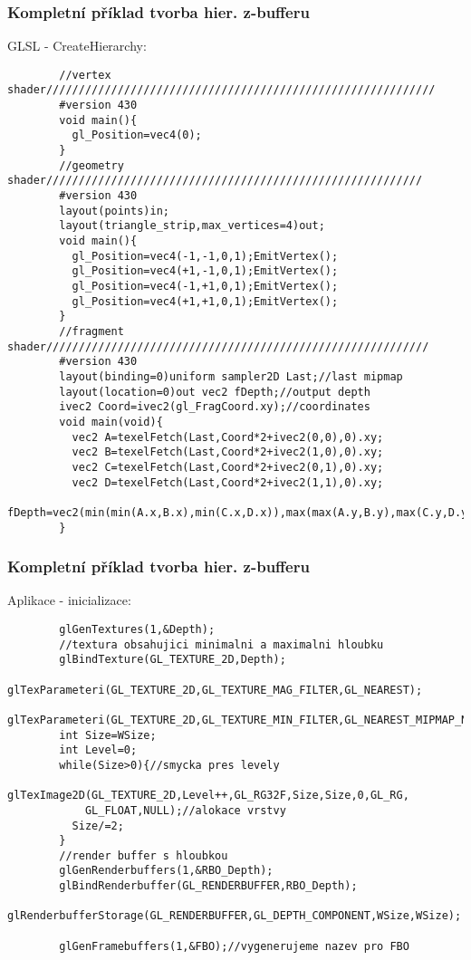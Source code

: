 \begin{frame}[fragile]
\frametitle{Kompletní příklad tvorba hier. z-bufferu}
		GLSL - CreateHierarchy:
		{\tiny
		\begin{verbatim}
		//vertex shader////////////////////////////////////////////////////////////
		#version 430
		void main(){
		  gl_Position=vec4(0);
		}
		//geometry shader//////////////////////////////////////////////////////////
		#version 430
		layout(points)in;
		layout(triangle_strip,max_vertices=4)out;
		void main(){
		  gl_Position=vec4(-1,-1,0,1);EmitVertex();
		  gl_Position=vec4(+1,-1,0,1);EmitVertex();
		  gl_Position=vec4(-1,+1,0,1);EmitVertex();
		  gl_Position=vec4(+1,+1,0,1);EmitVertex();
		}
		//fragment shader///////////////////////////////////////////////////////////
		#version 430
		layout(binding=0)uniform sampler2D Last;//last mipmap
		layout(location=0)out vec2 fDepth;//output depth
		ivec2 Coord=ivec2(gl_FragCoord.xy);//coordinates
		void main(void){
		  vec2 A=texelFetch(Last,Coord*2+ivec2(0,0),0).xy;
		  vec2 B=texelFetch(Last,Coord*2+ivec2(1,0),0).xy;
		  vec2 C=texelFetch(Last,Coord*2+ivec2(0,1),0).xy;
		  vec2 D=texelFetch(Last,Coord*2+ivec2(1,1),0).xy;
		  fDepth=vec2(min(min(A.x,B.x),min(C.x,D.x)),max(max(A.y,B.y),max(C.y,D.y)));
		}
		\end{verbatim}
		}
\end{frame}

\begin{frame}[fragile]
\frametitle{Kompletní příklad tvorba hier. z-bufferu}
		Aplikace - inicializace:
		{\scriptsize
		\begin{verbatim}
		glGenTextures(1,&Depth);
		//textura obsahujici minimalni a maximalni hloubku
		glBindTexture(GL_TEXTURE_2D,Depth);
		glTexParameteri(GL_TEXTURE_2D,GL_TEXTURE_MAG_FILTER,GL_NEAREST);
		glTexParameteri(GL_TEXTURE_2D,GL_TEXTURE_MIN_FILTER,GL_NEAREST_MIPMAP_NEAREST);
		int Size=WSize;
		int Level=0;
		while(Size>0){//smycka pres levely
		  glTexImage2D(GL_TEXTURE_2D,Level++,GL_RG32F,Size,Size,0,GL_RG,
		    GL_FLOAT,NULL);//alokace vrstvy
		  Size/=2;
		}
		//render buffer s hloubkou
		glGenRenderbuffers(1,&RBO_Depth);
		glBindRenderbuffer(GL_RENDERBUFFER,RBO_Depth);
		glRenderbufferStorage(GL_RENDERBUFFER,GL_DEPTH_COMPONENT,WSize,WSize);

		glGenFramebuffers(1,&FBO);//vygenerujeme nazev pro FBO
		\end{verbatim}
		}
\end{frame}

